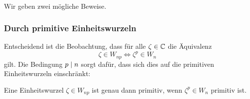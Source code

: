 \subsection{}

Wir geben zwei mögliche Beweise.



\subsubsection*{Durch primitive Einheitswurzeln}

Entscheidend ist die Beobachtung, dass für alle $\zeta \in \mathbb{C}$ die Äquivalenz
\[
        \zeta \in W_{np}
  \iff  \zeta^p \in W_n
\]
gilt.
Die Bedingung $p \mathrel{|} n$ sorgt dafür, dass sich dies auf die primitiven Einheitswurzeln einschränkt:

\begin{claim}
  Eine Einheitswurzel $\zeta \in W_{np}$ ist genau dann primitiv, wenn $\zeta^p \in W_n$ primitiv ist.
\end{claim}

